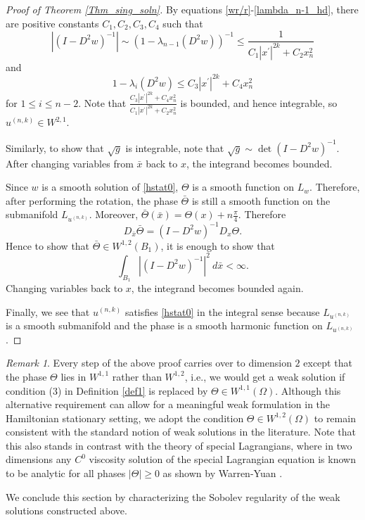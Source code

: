\documentclass[12pt,reqno]{amsart}%
\theoremstyle{plain}
\numberwithin{equation}{section}
\theoremstyle{definition}
\theoremstyle{remark}
\newtheorem{remark}{Remark}[section]
\begin{document}
\begin{proof}[Proof of Theorem \ref{Thm_sing_soln}]
By equations \eqref{wr/r}-\eqref{lambda_n-1_hd}, there are positive constants $C_1, C_2, C_3 ,C_4$ such that 
$$ | (I - D^2 w)^{-1} | \sim ( 1 - \lambda_{n-1} ( D^2 w ) ) ^{-1} \leq \frac{ 1}{ C_1 | x^\prime |^ {2k} + C_2 x_n ^2 } $$ and 
$$ 1- \lambda_i ( D^2 w ) \leq C_3 |x^\prime | ^ {2k} + C_4 x_n^2 $$ for $1 \leq i \leq n-2.$ 
Note that $\frac{ C_3 |x^\prime |^{2k} + C_4 x_n^2 } { C_1 |x^\prime |^{2k} + C_2 x_n^2 } $ is bounded, and hence integrable, so $u^{(n,k)} \in W^{2,1}.$

Similarly, to show that $\sqrt { g } $ is integrable, note that $\sqrt {  g }  \sim \det ( I - D^2 w )^{-1} $. After changing variables from $\bar x$ back to $x$, the integrand becomes bounded. 

Since $w$ is a smooth solution of \eqref{hstat0}, $\Theta$ is a smooth function on $L_w$. Therefore, after performing the rotation, the phase $ \bar \Theta $ is still a smooth function on the submanifold $L_{u^{(n,k)}}$. Moreover, $\bar \Theta ( \bar x ) = \Theta (x) + n \frac \pi 4 .$ Therefore 
$$ D_{\bar x} \bar \Theta =  (I - D^2 w )^{-1}  D_x \Theta .$$
Hence to show that $\bar \Theta \in W^{1,2} ( B_1)$, it is enough to show that 
$$ \int _{B_1}|(I - D^2 w )^{-1} |^2 \: d \bar x < \infty.$$
Changing variables back to $x$, the integrand becomes bounded again. 

Finally, we see that $u^{(n,k)} $ satisfies \eqref{hstat0} in the integral sense because $L_{u^{(n,k)}} $ is a smooth submanifold and the phase is a smooth harmonic function on $L_{u^{(n,k)}} $. 
\end{proof} 

\begin{remark} 
Every step of the above proof carries over to dimension $2$ except that the phase $\Theta$ lies in $W^{1,1}$ rather than $W^{1,2}$,
i.e., we would get a weak solution if condition (3) in Definition \ref{def1} is replaced by $\Theta \in W^{1,1}(\Omega)$. Although this alternative requirement can allow for a meaningful weak formulation in the Hamiltonian stationary setting, we adopt the condition $\Theta \in W^{1,2}(\Omega)$ to remain consistent with the standard notion of weak solutions in the literature. Note that this also stands in contrast with the theory of special Lagrangians, where in two dimensions any $C^0$ viscosity solution of the special Lagrangian equation is known to be analytic for all phases $|\Theta| \ge 0$ as shown by Warren-Yuan \cite{WY2d}.
\end{remark}

We conclude this section by characterizing the Sobolev regularity of the weak solutions constructed above.
\end{document}
